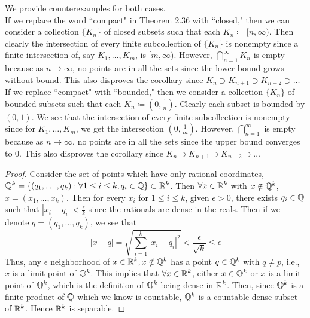 \documentclass[12pt]{article}
\begin{document}
\begin{exercise}{15}
    \begin{solution}We provide counterexamples for both cases. \\
    If we replace the word ``compact" in Theorem 2.36 with ``closed," then we can consider a collection $\{ K_n \}$ of closed subsets such that each $K_n \coloneqq [n, \infty)$. Then clearly the intersection of every finite subcollection of $\{ K_n \}$ is nonempty since a finite intersection of, say $K_1, \dots, K_m$, is $[m, \infty)$. However, $\bigcap_{n = 1}^\infty K_n$ is empty because as $n \to \infty$, no points are in all the sets since the lower bound grows without bound. This also disproves the corollary since $K_n \supset K_{n + 1} \supset K_{n + 2} \supset \dots$ \\
    If we replace ``compact" with ``bounded," then we consider a collection $\{ K_n \}$ of bounded subsets such that each $K_n \coloneqq \left( 0, \frac{1}{n} \right)$. Clearly each subset is bounded by $(0, 1)$. We see that the intersection of every finite subcollection is nonempty since for $K_1, \dots, K_m$, we get the intersection $\left( 0, \frac{1}{m} \right)$. However, $\bigcap_{n = 1}^\infty$ is empty because as $n \to \infty$, no points are in all the sets since the upper bound converges to 0. This also disproves the corollary since $K_n \supset K_{n + 1} \supset K_{n + 2} \supset \dots$  
    \end{solution}
\end{exercise}

\begin{exercise}{22}
    \begin{proof}
        Consider the set of points which have only rational coordinates, $\mathbb{Q}^k = \{ (q_1, \dots, q_k) : \forall 1 \le i \le k, q_i \in \mathbb{Q} \} \subset \mathbb{R}^k$. Then $\forall x \in \mathbb{R}^k$ with $x \notin \mathbb{Q}^k$, $x = (x_1, \dots, x_k)$. Then for every $x_i$ for $1 \le i \le k$, given $\epsilon > 0$, there exists $q_i \in \mathbb{Q}$ such that $|x_i - q_i| < \frac{\epsilon}{k}$ since the rationals are dense in the reals. Then if we denote $q = (q_1, \dots, q_k)$, we see that $$|x - q| = \sqrt{\sum_{i = 1}^k |x_i - q_i|^2} < \frac{\epsilon}{\sqrt{k}} \le \epsilon$$ Thus, any $\epsilon$ neighborhood of $x \in \mathbb{R}^k, x \notin \mathbb{Q}^k$ has a point $q \in \mathbb{Q}^k$ with $q \neq p$, i.e., $x$ is a limit point of $\mathbb{Q}^k$. This implies that $\forall x \in \mathbb{R}^k$, either $x \in \mathbb{Q}^k$ or $x$ is a limit point of $\mathbb{Q}^k$, which is the definition of $\mathbb{Q}^k$ being dense in $\mathbb{R}^k$. Then, since $\mathbb{Q}^k$ is a finite product of $\mathbb{Q}$ which we know is countable, $\mathbb{Q}^k$ is a countable dense subset of $\mathbb{R}^k$. Hence $\mathbb{R}^k$ is separable. 
    \end{proof}
\end{exercise}
\end{document}
